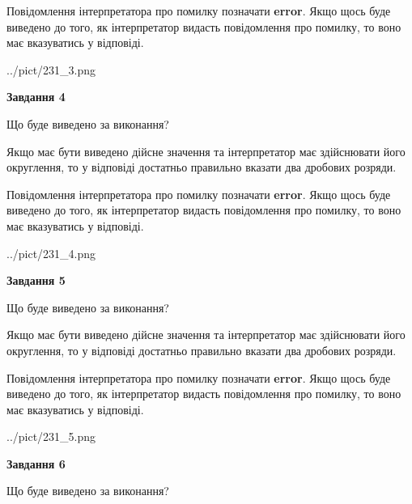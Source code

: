 \documentclass[12pt, ukrainian]{article}
\begin{document}
{\begin {Large}
Повідомлення інтерпретатора про помилку позначати \textbf{error}.
Якщо щось буде виведено до того, як інтерпретатор видасть повідомлення про помилку, 
то воно має вказуватись у відповіді. \par

\begin{center}
	{../pict/231_3.png}
\end{center}
\newpage

{\begin {center}\textbf{Завдання 4}\end {center}}\par
Що буде виведено за виконання? \par

Якщо має бути виведено дійсне значення та інтерпретатор має здійснювати його округлення, 
то у відповіді достатньо правильно вказати два дробових розряди.

Повідомлення інтерпретатора про помилку позначати \textbf{error}.
Якщо щось буде виведено до того, як інтерпретатор видасть повідомлення про помилку, 
то воно має вказуватись у відповіді. \par

\begin{center}
	{../pict/231_4.png}
\end{center}
\newpage

{\begin {center}\textbf{Завдання 5}\end {center}}\par
Що буде виведено за виконання? \par

Якщо має бути виведено дійсне значення та інтерпретатор має здійснювати його округлення, 
то у відповіді достатньо правильно вказати два дробових розряди.

Повідомлення інтерпретатора про помилку позначати \textbf{error}.
Якщо щось буде виведено до того, як інтерпретатор видасть повідомлення про помилку, 
то воно має вказуватись у відповіді. \par

\begin{center}
	{../pict/231_5.png}
\end{center}
\newpage

{\begin {center}\textbf{Завдання 6}\end {center}}\par
Що буде виведено за виконання? \par


\end{Large}}
\end{document}
